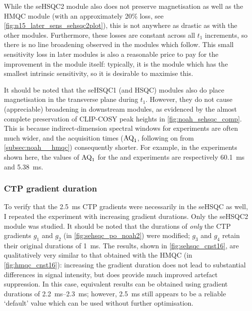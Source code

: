 While the \nitrogen{} seHSQC2 module also does not preserve  magnetisation as well as the HMQC module (with an approximately 20\% loss, see \cref{fig:n15_later_sens_sehsqc2plot}), this is not anywhere as drastic as with the other modules.
Furthermore, these losses are constant across all $t_1$ increments, so there is no line broadening observed in the modules which follow.
This small sensitivity loss in later modules is also a reasonable price to pay for the improvement in the \nitrogen{} module itself: typically, it is the \nitrogen{} module which has the smallest intrinsic sensitivity, so it is desirable to maximise this.

It should be noted that the \carbon{} seHSQC1 (and HSQC) modules also do place  magnetisation in the transverse plane during $t_1$.
However, they do not cause (appreciable) broadening in downstream modules, as evidenced by the almost complete preservation of CLIP-COSY peak heights in \cref{fig:noah_sehsqc_comp}.
This is because indirect-dimension spectral windows for \carbon{} experiments are often much wider, and the acquisition times ($\text{AQ}_1$, following on from \cref{subsec:noah__hmqc}) consequently shorter.
For example, in the  experiments shown here, the values of $\text{AQ}_1$ for the \nitrogen{} and \carbon{} experiments are respectively \qty{60.1}{\ms} and \qty{5.38}{\ms}.


\subsubsection{CTP gradient duration}

To verify that the \qty{2.5}{\ms} CTP gradients were necessarily in the \nitrogen{} seHSQC as well, I repeated the  experiment with increasing gradient durations.
Only the seHSQC2 module was studied.
It should be noted that the durations of \textit{only} the CTP gradients $g_1$ and $g_2$ (in \cref{fig:sehsqc_po_noah2}) were modified; $g_3$ and $g_4$ retain their original durations of \qty{1}{\ms}.
The results, shown in \cref{fig:sehsqc_cnst16}, are qualitatively very similar to that obtained with the HMQC (in \cref{fig:hmqc_cnst16}): increasing the gradient duration does not lead to substantial differences in signal intensity, but does provide much improved artefact suppression.
In this case, equivalent results can be obtained using gradient durations of \qtyrange{2.2}{2.3}{\ms}; however, \qty{2.5}{\ms} still appears to be a reliable `default' value which can be used without further optimisation.

